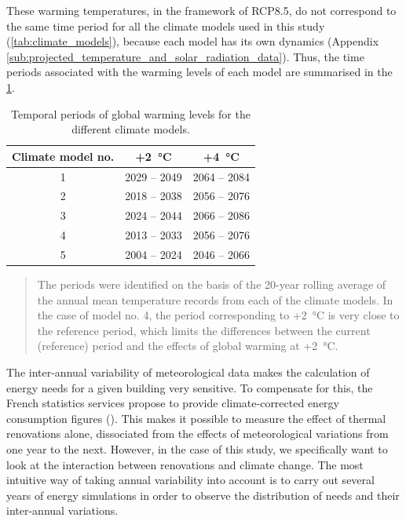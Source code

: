 \documentclass[11pt]{article}
\begin{document}
        These warming temperatures, in the framework of RCP8.5, do not correspond to the same time period for all the climate models used in this study (\ref{tab:climate_models}), because each model has its own dynamics (Appendix \ref{sub:projected_temperature_and_solar_radiation_data}). Thus, the time periods associated with the warming levels of each model are summarised in the \ref{tab:climate_periods}. 

        \begin{table}[ht]
            \centering
            \caption{\label{tab:climate_periods} Temporal periods of global warming levels for the different climate models.}
            \small
            \begin{tabular}{ccc}
                \toprule
                Climate model no. & +\SI{2}{\celsius} & +\SI{4}{\celsius} \\
                \midrule
                1 & 2029 -- 2049 & 2064 -- 2084 \\
                2 & 2018 -- 2038 & 2056 -- 2076 \\
                3 & 2024 -- 2044 & 2066 -- 2086 \\
                4 & 2013 -- 2033 & 2056 -- 2076 \\
                5 & 2004 -- 2024 & 2046 -- 2066 \\
                \bottomrule
                \end{tabular}
            \begin{quote}
                \small\noindent
                The periods were identified on the basis of the 20-year rolling average of the annual mean temperature records from each of the climate models. In the case of model no. 4, the period corresponding to +\SI{2}{\celsius} is very close to the reference period, which limits the differences between the current (reference) period and the effects of global warming at +\SI{2}{\celsius}.
            \end{quote}
        \end{table}

        The inter-annual variability of meteorological data makes the calculation of energy needs for a given building very sensitive. To compensate for this, the French statistics services propose to provide climate-corrected energy consumption figures (\cite{sdes_bilan_2023}). This makes it possible to measure the effect of thermal renovations alone, dissociated from the effects of meteorological variations from one year to the next. However, in the case of this study, we specifically want to look at the interaction between renovations and climate change. The most intuitive way of taking annual variability into account is to carry out several years of energy simulations in order to observe the distribution of needs and their inter-annual variations. \\
\end{document}
